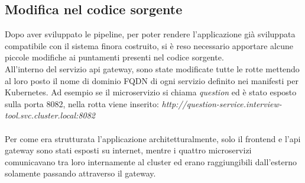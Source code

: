 \documentclass[a4paper,12pt]{report}
\begin{document}
\subsection{Modifica nel codice sorgente}
Dopo aver sviluppato le pipeline, per poter rendere l'applicazione già sviluppata compatibile con il sistema finora costruito, si è reso necessario apportare alcune piccole modifiche ai puntamenti presenti nel codice sorgente.\\
All'interno del servizio api gateway, sono state modificate tutte le rotte mettendo al loro posto il nome di dominio FQDN di ogni servizio definito nei manifesti per Kubernetes. Ad esempio se il microservizio si chiama \textit{question} ed è stato esposto sulla porta 8082, nella rotta viene inserito: \textit{http://question-service.interview-tool.svc.cluster.local:8082}\\ \\
Per come era strutturata l'applicazione architetturalmente, solo il frontend e l'api gateway sono stati esposti su internet, mentre i quattro microservizi comunicavano tra loro internamente al cluster ed erano raggiungibili dall'esterno solamente passando attraverso il gateway.\\ \\ \\ \\ \\ \\
\end{document}

